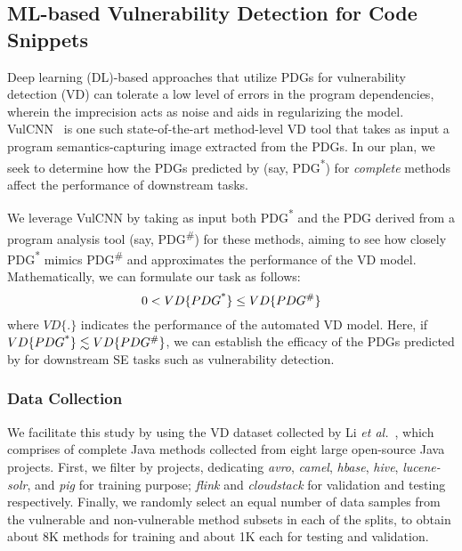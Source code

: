 \subsection{ML-based Vulnerability Detection for Code Snippets}
\label{sec:vd}




Deep learning (DL)-based approaches that utilize PDGs for
vulnerability detection (VD) can tolerate a low level of errors in the
program dependencies, wherein the imprecision acts as noise and aids
in regularizing the model. VulCNN~\cite{wu2022vulcnn} is one such
state-of-the-art method-level VD tool that takes as input a program
semantics-capturing image extracted from the PDGs. In our plan,
we seek to determine how the PDGs predicted by \tool (say,
PDG\textsuperscript{*}) for {\em complete} methods affect the
performance of downstream tasks.


We leverage VulCNN by taking as input both PDG\textsuperscript{*} and
the PDG derived from a program analysis tool (say,
PDG\textsuperscript{\#}) for these methods, aiming to see how closely
PDG\textsuperscript{*} mimics PDG\textsuperscript{\#} and approximates
the performance of the VD model. Mathematically, we can formulate our
task as follows:
\begin{equation}
    \centering
    0 < VD\{PDG\textsuperscript{*}\} \leq VD\{PDG\textsuperscript{\#}\}
\end{equation}
where $VD\{.\}$ indicates the performance of the automated VD model. Here, if $VD\{PDG\textsuperscript{*}\} \lesssim VD\{PDG\textsuperscript{\#}\}$, we can establish the efficacy of the PDGs predicted by \tool for downstream SE tasks such as vulnerability detection.


\subsubsection*{\bf Data Collection}
We facilitate this study by using the VD dataset collected by Li {\em
  et al.}~\cite{yioopsla19}, which comprises of
complete Java methods collected from eight large
open-source Java projects. First, we filter by projects, dedicating
\textit{avro}, \textit{camel}, \textit{hbase}, \textit{hive},
\textit{lucene-solr}, and \textit{pig} for training purpose;
\textit{flink} and \textit{cloudstack} for validation and testing
respectively.
Finally, we randomly select an equal number of data samples from the
vulnerable and non-vulnerable method subsets in each of the splits, to
obtain about 8K methods for training and about 1K each for testing and
validation.

